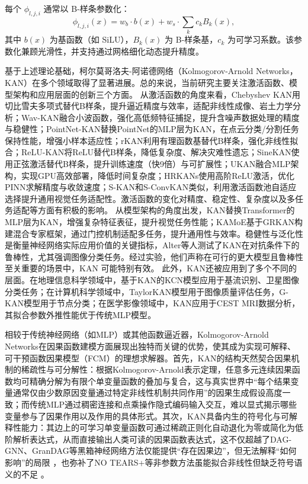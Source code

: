 每个 $\phi_{l,j,i}$ 通常以 B-样条参数化：
\[
\phi_{l,j,i}(x) = w_b \cdot b(x) + w_s \cdot \sum_{k} c_k B_k(x),
\]
其中 $b(x)$ 为基函数（如 SiLU），$B_k(x)$ 为 B-样条基，$c_k$ 为可学习系数。该参数化兼顾光滑性，并支持通过网格细化动态提升精度。

基于上述理论基础，柯尔莫哥洛夫-阿诺德网络（Kolmogorov-Arnold Networks，KAN）\cite{Ziming2025}在多个领域取得了显著进展。总的来说，当前研究主要关注激活函数、模型架构和应用层面的创新三个方面。
从激活函数的角度来看，Chebyshev KAN\cite{SS2024}用切比雪夫多项式替代B样条，提升逼近精度与效率，适配非线性成像、岩土力学分析；Wav-KAN\cite{Bozorgasl2024}融合小波函数，强化高低频特征捕捉，提升含噪声数据处理的精度与稳健性；PointNet-KAN\cite{Kashefi2024}替换PointNet的MLP层为KAN，在点云分类/分割任务保持性能，增强小样本适应性；rKAN\cite{Aghaei2024}利用有理函数基替代B样条，强化非线性拟合；ReLU-KAN\cite{Qiu2024}将ReLU替代B样条，降低复杂度、解决灾难性遗忘；SineKAN\cite{Reinhardt2025}使用正弦激活替代B样条，提升训练速度（快9倍）与可扩展性；UKAN\cite{Moradzadeh2024}融合MLP架构，实现GPU高效部署，降低时间复杂度；HRKANs\cite{So2024}使用高阶ReLU激活，优化PINN求解精度与收敛速度；S-KAN\cite{Yang2024}和S-ConvKAN\cite{Yang2024}类似，利用激活函数池自适应选择提升通用视觉任务适配性。激活函数的变化对精度、稳定性、复杂度以及多任务适配等方面有积极的影响。
从模型架构的角度出发，KAN\cite{Yang2025}替换Transformer的MLP层为KAN，增强复杂特征表征，提升视觉任务性能；KAMoE\cite{So2024}基于GRKAN构建混合专家框架，通过门控机制适配多任务，提升通用性与效率。稳健性与泛化性是衡量神经网络实际应用价值的关键指标，Alter等人\cite{alter2025}测试了KAN在对抗条件下的鲁棒性，尤其强调图像分类任务。经过实验，他们声称在可行的更大模型且鲁棒性至关重要的场景中，KAN 可能特别有效。
此外，KAN还被应用到了多个不同的层面。在地理信息科学领域中，基于KAN的KCN模型应用于基流识别、卫星图像分类任务\cite{Liu2025}；在计算机科学领域中，TaylorKAN模型\cite{Yu2024}用于图像质量评估任务，G-KAN模型\cite{袁立宁2025}用于节点分类；在医学影像领域中，KAN应用于CEST MRI数据分析，其拟合参数外推性能优于传统MLP模型\cite{Wang2025a}。

相较于传统神经网络（如MLP）或其他函数逼近器，Kolmogorov-Arnold Networks在因果函数建模方面展现出独特而关键的优势，使其成为实现可解释、可干预函数因果模型（FCM）的理想求解器。首先，KAN的结构天然契合因果机制的稀疏性与可分解性：根据Kolmogorov-Arnold表示定理，任意多元连续因果函数均可精确分解为有限个单变量函数的叠加与复合，这与真实世界中“每个结果变量通常仅由少数原因变量通过特定非线性机制共同作用”的因果生成假设高度一致；而传统MLP通过稠密连接和点乘操作隐式编码输入交互，难以显式揭示哪些变量参与了因果作用以及作用的具体形式。其次，KAN具备内生的符号化与可解释性能力：其边上的可学习单变量函数可通过稀疏正则化自动退化为零或简化为低阶解析表达式，从而直接输出人类可读的因果函数表达式，这不仅超越了DAG-GNN、GranDAG等黑箱神经网络方法仅能提供“存在因果边”，但无法解释“如何影响”的局限 \cite{Yu2019, Lachapelle2020}，也弥补了NO TEARS+等非参数方法虽能拟合非线性但缺乏符号语义的不足 \cite{Zheng2020a}。
